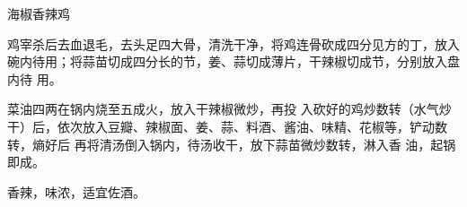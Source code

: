 \begin{recipe}[钢铁仔鸡]{海椒香辣鸡}

\ingredients


\cooking

\step 鸡宰杀后去血退毛，去头足四大骨，清洗干净，将鸡连骨砍成四分见方的丁，放入碗内待用；将蒜苗切成四分长的节，姜、蒜切成薄片，干辣椒切成节，分别放入盘内待 用。

\step 菜油四两在锅内烧至五成火，放入干辣椒微炒，再投 入砍好的鸡炒数转（水气炒干）后，依次放入豆瓣、辣椒面、姜、蒜、料酒、酱油、味精、花椒等，铲动数转，熵好后 再将清汤倒入锅内，待汤收干，放下蒜苗微炒数转，淋入香 油，起锅即成。

\notes

香辣，味浓，适宜佐酒。

\end{recipe}

